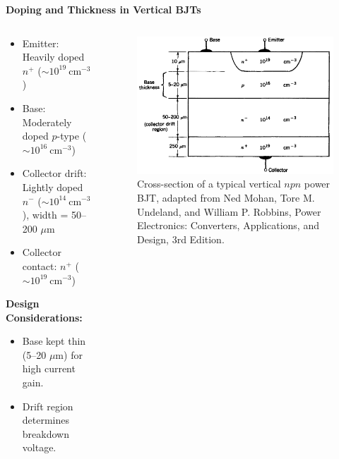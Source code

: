 \begin{frame}{\textbf{Doping and Thickness in Vertical BJTs}}
        \begin{columns}
        \begin{column}{0.35\textwidth}
            \begin{itemize}
                \item Emitter: Heavily doped $n^+$ ($\sim 10^{19}~\text{cm}^{-3}$)
                \item Base: Moderately doped $p$-type ($\sim 10^{16}~\text{cm}^{-3}$)
                \item Collector drift: Lightly doped $n^-$ ($\sim 10^{14}~\text{cm}^{-3}$), width = 50–200 $\mu$m
                \item Collector contact: $n^+$ ($\sim 10^{19}~\text{cm}^{-3}$)
            \end{itemize}
            \textbf{Design Considerations:}
            \begin{itemize}
                \item Base kept thin (5–20 $\mu$m) for high current gain.
                \item Drift region determines breakdown voltage.
            \end{itemize}
        \end{column}

        \begin{column}{0.65\textwidth}
            \begin{figure}
                \centering
                \includegraphics[scale=0.25]{fig/lec04/vertical_BJT_structure.png}
                \caption{Cross-section of a typical vertical $npn$ power BJT, adapted from Ned Mohan, Tore M. Undeland, and William P. Robbins, Power Electronics: Converters, Applications, and Design, 3rd Edition.}
            \end{figure}
        \end{column}
    \end{columns}
\end{frame}


